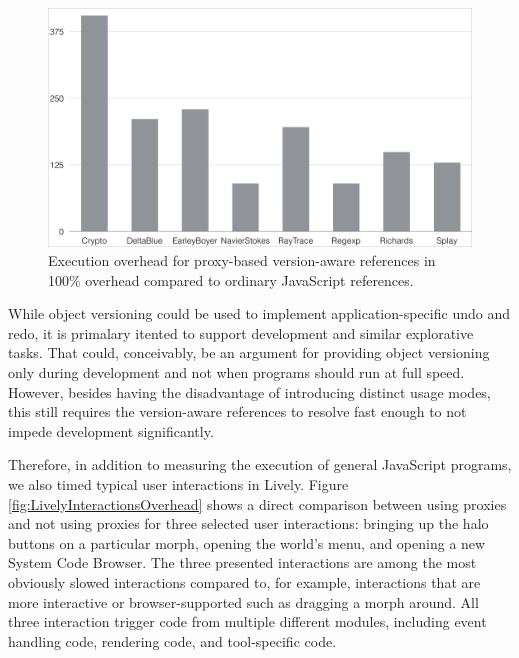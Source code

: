 \begin{figure}[h]
    \centering
    \includegraphics[width=\textwidth]{figures/executionOverhead.pdf}
    \caption{Execution overhead for proxy-based version-aware references in 100\% overhead compared to ordinary JavaScript references.}
    \label{fig:ExecutionOverhead}
\end{figure}


While object versioning could be used to implement application-specific undo and redo, it is primalary itented to support development and similar explorative tasks.
That could, conceivably, be an argument for providing object versioning only during development and not when programs should run at full speed.
However, besides having the disadvantage of introducing distinct usage modes, this still requires the version-aware references to resolve fast enough to not impede development significantly.

Therefore, in addition to measuring the execution of general JavaScript programs, we also timed typical user interactions in Lively.
Figure \ref{fig:LivelyInteractionsOverhead} shows a direct comparison between using proxies and not using proxies for three selected user interactions: bringing up the halo buttons on a particular morph, opening the world's menu, and opening a new System Code Browser.
The three presented interactions are among the most obviously slowed interactions compared to, for example, interactions that are more interactive or browser-supported such as dragging a morph around.
All three interaction trigger code from multiple different modules, including event handling code, rendering code, and tool-specific code.

